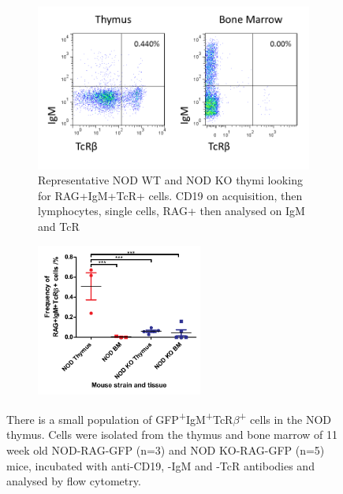 \begin{figure}
	\begin{subfigure}{\textwidth}
	\includegraphics[width=\textwidth]{Figures/ThyvBMIgMTcR.png}
	\caption{Representative NOD WT and NOD KO thymi looking for RAG+IgM+TcR+ cells. CD19 on acquisition, then lymphocytes, single cells, RAG+ then analysed on IgM and TcR}
	\label{subfig:BMvThyRAGIgMTcR}
	\end{subfigure}
	\begin{subfigure}{\textwidth}
	\centering
	\includegraphics[width=0.6\textwidth]{Figures/IgMTcR.pdf}
	\caption{}
	\label{subfig:IgMTcRposgraph}
	\end{subfigure}
\caption[There is a small population of IgM\textsuperscript{+}TcR$\beta$\textsuperscript{+} cells in the NOD thymus]{There is a small population of GFP\textsuperscript{+}IgM\textsuperscript{+}TcR$\beta$\textsuperscript{+} cells in the NOD thymus. 
Cells were isolated from the thymus and bone marrow of 11 week old NOD-RAG-GFP (n=3) and NOD KO-RAG-GFP (n=5) mice, incubated with anti-CD19, -IgM and -TcR antibodies and analysed by flow cytometry.
}
\end{figure}
